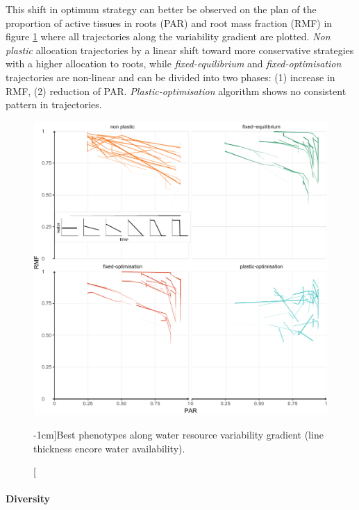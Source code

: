  This shift in optimum strategy can better be observed on the plan of the proportion of active tissues in roots (PAR) and root mass fraction (RMF) in figure \ref{fig:variable_trajectories} where all trajectories along the variability gradient are plotted. \textit{Non plastic} allocation trajectories by a linear shift toward more conservative strategies with a higher allocation to roots, while \textit{fixed-equilibrium} and \textit{fixed-optimisation} trajectories are non-linear and can be divided into two phases: (1) increase in RMF, (2) reduction of PAR. \textit{Plastic-optimisation} algorithm shows no consistent pattern in trajectories.


\begin{figure}
\includegraphics[width = \textwidth]{./2_PP/Figures/Variable/var_2D_strat_dyn.pdf}
\caption[Best phenotypes along water resource variability gradient][-1cm]{Best phenotypes along water resource variability gradient (line thickness encore water availability).}\label{fig:variable_trajectories}
\end{figure}

\paragraph[2.5cm]{Diversity}

